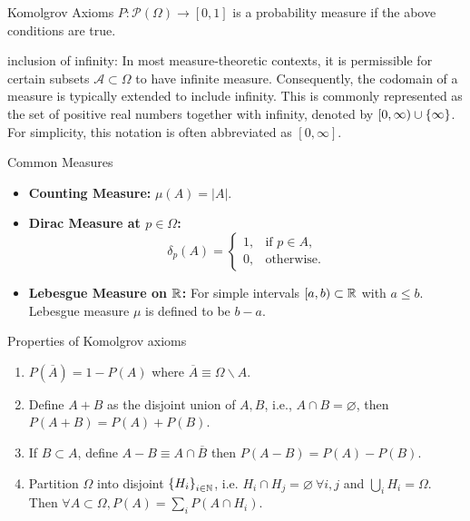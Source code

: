 \begin{thm}{Komolgrov Axioms}
	$P:\mathscr{P}(\Omega) \rightarrow [0, 1]$ is a probability measure if the above conditions are true. 
\end{thm}

\begin{rmk}{inclusion of infinity:}
In most measure-theoretic contexts, it is permissible for certain subsets  $\mathcal{A}\subset \Omega$ to have infinite measure. Consequently, the codomain of a measure is typically extended to include infinity. This is commonly represented as the set of positive real numbers together with infinity, denoted by $[0, \infty)\cup\qty{\infty}$. For simplicity, this notation is often abbreviated as $[0, \infty]$. 
\end{rmk}


\begin{eg}{Common Measures}
\begin{itemize}
    \item \textbf{Counting Measure:} \(\mu(A) = |A|\).
    \item \textbf{Dirac Measure at \(p \in \Omega\):}
    \[
    \delta_p(A) = 
    \begin{cases} 
    1, & \text{if } p \in A, \\
    0, & \text{otherwise}.
    \end{cases}
    \]
    \item \textbf{Lebesgue Measure on ${\mathbb{R}}$:} For simple intervals $[a, b)\subset {\mathbb{R}}$ with $a\leq b$. Lebesgue measure $\mu$ is defined to be $b-a$. 
\end{itemize}
\end{eg}

\begin{prop}{Properties of Komolgrov axioms}
\begin{enumerate}
	\item $P(\overline A) = 1-P(A)$ where $\overline A \equiv \Omega\backslash A$.
	\item Define $A+B$ as the disjoint union of $A, B$, i.e., $A\cap B = \varnothing$, then $P(A+B) = P(A) + P(B)$. 
	\item If $B\subset A$, define $A-B \equiv A\cap \overline B$  then $P(A-B) = P(A) - P(B)$. 
	\item Partition $\Omega$ into disjoint $\qty{H_i}_{i\in \mathbb{N}}$, i.e. $H_i\cap H_j = \varnothing \ \forall i, j$ and $\bigcup_i H_i = \Omega$. Then $\forall A\subset \Omega, P(A) = \sum_i P(A\cap H_i)$. 
\end{enumerate}
\end{prop}

